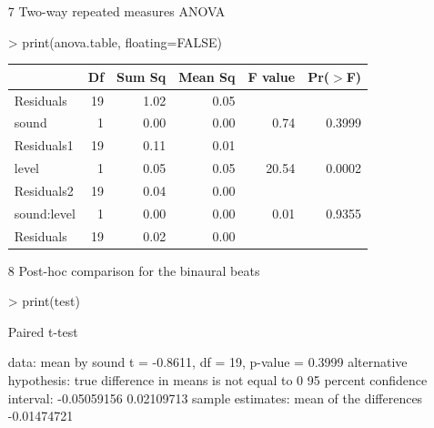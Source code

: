 \documentclass[12pt,a4paper]{article}
\begin{document}
\begin{itemize}
\item[7] Two-way repeated measures ANOVA
\begin{Schunk}
\begin{Sinput}
> print(anova.table, floating=FALSE)
\end{Sinput}
\begin{tabular}{lrrrrr}
  \hline
 & Df & Sum Sq & Mean Sq & F value & Pr($>$F) \\ 
  \hline
Residuals & 19 & 1.02 & 0.05 &  &  \\ 
  sound     & 1 & 0.00 & 0.00 & 0.74 & 0.3999 \\ 
  Residuals1 & 19 & 0.11 & 0.01 &  &  \\ 
  level     & 1 & 0.05 & 0.05 & 20.54 & 0.0002 \\ 
  Residuals2 & 19 & 0.04 & 0.00 &  &  \\ 
  sound:level & 1 & 0.00 & 0.00 & 0.01 & 0.9355 \\ 
  Residuals   & 19 & 0.02 & 0.00 &  &  \\ 
   \hline
\end{tabular}\end{Schunk}

\item[8] Post-hoc comparison for the binaural beats
\begin{Schunk}
\begin{Sinput}
> print(test)
\end{Sinput}
\begin{Soutput}
	Paired t-test

data:  mean by sound 
t = -0.8611, df = 19, p-value = 0.3999
alternative hypothesis: true difference in means is not equal to 0 
95 percent confidence interval:
 -0.05059156  0.02109713 
sample estimates:
mean of the differences 
            -0.01474721 
\end{Soutput}
\end{Schunk}

\end{itemize}
\end{document}
